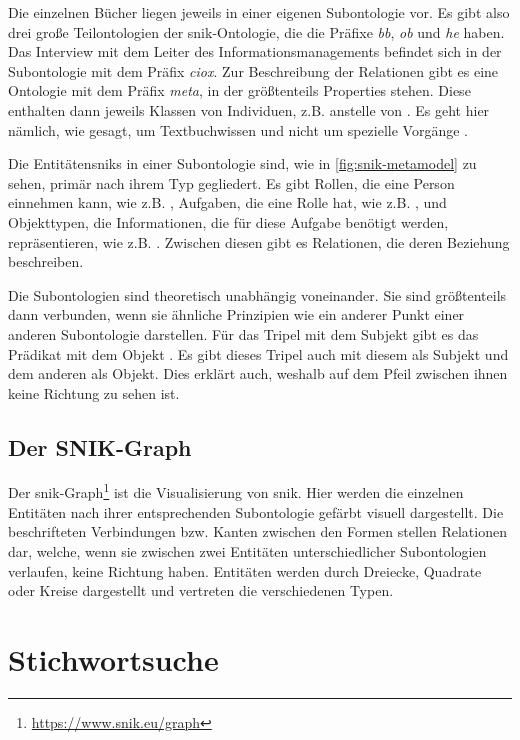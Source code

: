Die einzelnen Bücher liegen jeweils in einer eigenen Subontologie vor.
Es gibt also drei große Teilontologien der \ac{snik}-Ontologie, die die Präfixe \emph{bb}, \emph{ob} und \emph{he} haben.
Das Interview mit dem Leiter des Informationsmanagements befindet sich in der Subontologie mit dem Präfix \emph{ciox}.
Zur Beschreibung der Relationen gibt es eine Ontologie mit dem Präfix \emph{meta}, in der größtenteils Properties stehen.
Diese enthalten dann jeweils Klassen von Individuen, z.B.  anstelle von .
Es geht hier nämlich, wie gesagt, um Textbuchwissen und nicht um spezielle Vorgänge \citep{sniktec}.

Die Entitäten\ac{snik}s in einer Subontologie sind, wie in \cref{fig:snik-metamodel} zu sehen, primär nach ihrem Typ gegliedert.
Es gibt Rollen, die eine Person einnehmen kann, wie z.B. , Aufgaben, die eine Rolle hat, wie z.B. ,
und Objekttypen, die Informationen, die für diese Aufgabe benötigt werden, repräsentieren, wie z.B. .
Zwischen diesen gibt es Relationen, die deren Beziehung beschreiben.

Die Subontologien sind theoretisch unabhängig voneinander. Sie sind größtenteils dann verbunden,
wenn sie ähnliche Prinzipien wie ein anderer Punkt einer anderen Subontologie darstellen.
Für das Tripel mit dem Subjekt  gibt es das Prädikat  mit dem Objekt .
Es gibt dieses Tripel auch mit diesem als Subjekt und dem anderen als Objekt.
Dies erklärt auch, weshalb auf dem Pfeil zwischen ihnen keine Richtung zu sehen ist.


\subsection{Der SNIK-Graph}

Der \ac{snik}-Graph\footnote{\url{https://www.snik.eu/graph}} ist die Visualisierung von \ac{snik}.
Hier werden die einzelnen Entitäten nach ihrer entsprechenden Subontologie gefärbt visuell dargestellt.
Die beschrifteten Verbindungen bzw. Kanten zwischen den Formen stellen Relationen dar,
welche, wenn sie zwischen zwei Entitäten unterschiedlicher Subontologien verlaufen, keine Richtung haben.
Entitäten werden durch Dreiecke, Quadrate oder Kreise dargestellt und vertreten die verschiedenen Typen.

\section{Stichwortsuche}

